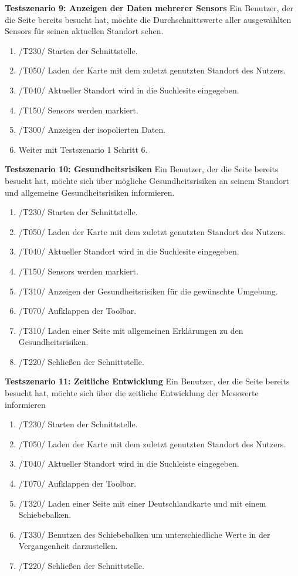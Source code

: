 \textbf{Testszenario 9: Anzeigen der Daten mehrerer \glspl{Sensor}}
\newline
Ein Benutzer, der die Seite bereits besucht hat, möchte die Durchschnittswerte aller ausgewählten \glspl{Sensor} für seinen aktuellen Standort sehen.
\begin{enumerate} [noitemsep]
    \item /T230/ Starten der Schnittstelle.
    \item /T050/ Laden der Karte mit dem zuletzt genutzten Standort des Nutzers.
    \item /T040/ Aktueller Standort wird in die Suchlesite eingegeben.
    \item /T150/ \glspl{Sensor} werden markiert.
    \item /T300/ Anzeigen der isopolierten Daten.
    \item Weiter mit Testszenario 1 Schritt 6.
\end{enumerate}

\textbf{Testszenario 10: Gesundheitsrisiken}
\newline
Ein Benutzer, der die Seite bereits besucht hat, möchte sich über mögliche Gesundheitsrisiken an seinem Standort und allgemeine Gesundheitsrisiken informieren.
\begin{enumerate} [noitemsep]
    \item /T230/ Starten der Schnittstelle.
    \item /T050/ Laden der Karte mit dem zuletzt genutzten Standort des Nutzers.
    \item /T040/ Aktueller Standort wird in die Suchlesite eingegeben.
    \item /T150/ \glspl{Sensor} werden markiert.
    \item /T310/ Anzeigen der Gesundheitsrisiken für die gewünschte Umgebung.
    \item /T070/ Aufklappen der \gls{Toolbar}.
    \item /T310/ Laden einer Seite mit allgemeinen Erklärungen zu den Gesundheitsrisiken.
    \item /T220/ Schließen der Schnittstelle.
\end{enumerate}


\textbf{Testszenario 11: Zeitliche Entwicklung}
\newline
Ein Benutzer, der die Seite bereits besucht hat, möchte sich über die zeitliche Entwicklung der Messwerte informieren
\begin{enumerate} [noitemsep]
    \item /T230/ Starten der Schnittstelle.
    \item /T050/ Laden der Karte mit dem zuletzt genutzten Standort des Nutzers.
    \item /T040/ Aktueller Standort wird in die Suchleiste eingegeben.
    \item /T070/ Aufklappen der \gls{Toolbar}.
    \item /T320/ Laden einer Seite mit einer Deutschlandkarte und mit einem Schiebebalken. 
    \item /T330/ Benutzen des Schiebebalken um unterschiedliche Werte in der Vergangenheit darzustellen.
    \item /T220/ Schließen der Schnittstelle.
\end{enumerate}
